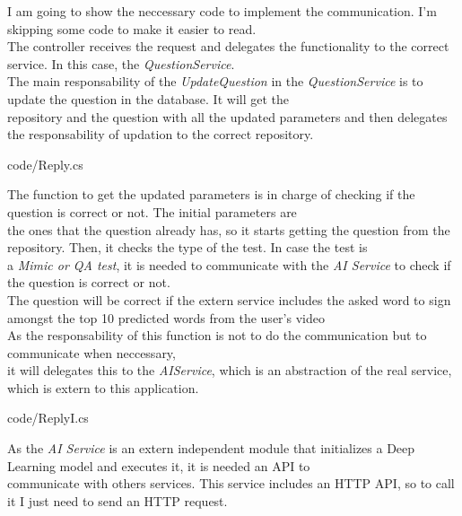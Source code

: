     I am going to show the neccessary code to implement the communication. I'm skipping some code to make it easier to read. \\

    The controller receives the request and delegates the functionality to the correct service. In this case, the \textit{QuestionService}. \\
    The main responsability of the \textit{UpdateQuestion} in the \textit{QuestionService} is to update the question in the database. It will get the \\
    repository and the question with all the updated parameters and then delegates the responsability of updation to the correct repository. 
    
    {code/Reply.cs}

    The function to get the updated parameters is in charge of checking if the question is correct or not. The initial parameters are \\
    the ones that the question already has, so it starts getting the question from the repository. Then, it checks the type of the test. In case the test is \\
    a \textit{Mimic or QA test}, it is needed to communicate with the \textit{AI Service} to check if the question is correct or not. \\
    The question will be correct if the extern service includes the asked word to sign amongst the top 10 predicted words from the user's video \\
    As the responsability of this function is not to do the communication but to communicate when neccessary, \\
    it will delegates this to the \textit{AIService}, which is an abstraction of the real service, which is extern to this application. 
    
    {code/ReplyI.cs}

    As the \textit{AI Service} is an extern independent module that initializes a Deep Learning model and executes it, it is needed an API to \\
    communicate with others services. This service includes an HTTP API, so to call it I just need to send an HTTP request. \\
    
